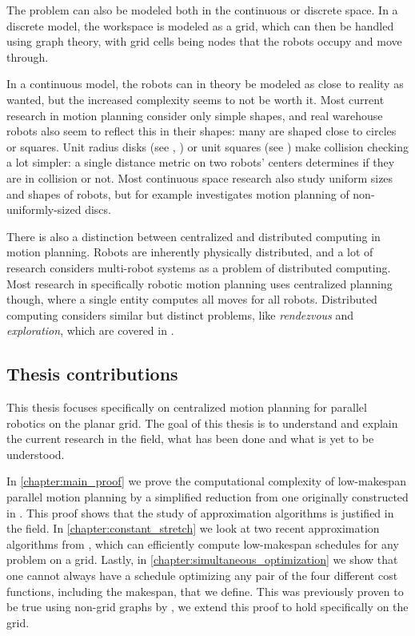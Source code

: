The problem can also be modeled both in the continuous or discrete space.
In a discrete model, the workspace is modeled as a grid, which can then be handled using graph theory, with grid cells being nodes that the robots occupy and move through.

In a continuous model, the robots can in theory be modeled as close to reality as wanted, but the increased complexity seems to not be worth it.
Most current research in motion planning consider only simple shapes, and real warehouse robots also seem to reflect this in their shapes: many are shaped close to circles or squares.
Unit radius disks (see \cite{siamcomp/DemaineFKMS19}, \cite{compgeom/BanyassadyBBBFH22}) or unit squares (see \cite{jea/YangV22}) make collision checking a lot simpler: a single distance metric on two robots' centers determines if they are in collision or not.
Most continuous space research also study uniform sizes and shapes of robots, but for example \cite{fun/BrockenHKLS21} investigates motion planning of non-uniformly-sized discs.

There is also a distinction between centralized and distributed computing in motion planning.
Robots are inherently physically distributed, and a lot of research considers multi-robot systems as a problem of distributed computing.
Most research in specifically robotic motion planning uses centralized planning though, where a single entity computes all moves for all robots.
Distributed computing considers similar but distinct problems, like \emph{rendezvous} and \emph{exploration}, which are covered in \cite{lncs/FlocchiniGN19}.




\subsection{Thesis contributions}

This thesis focuses specifically on centralized motion planning for parallel robotics on the planar grid.
The goal of this thesis is to understand and explain the current research in the field, what has been done and what is yet to be understood.

In \cref{chapter:main_proof} we prove the computational complexity of low-makespan parallel motion planning by a simplified reduction from one originally constructed in \cite{siamcomp/DemaineFKMS19}.
This proof shows that the study of approximation algorithms is justified in the field.
In \cref{chapter:constant_stretch} we look at two recent approximation algorithms from \cite{siamcomp/DemaineFKMS19}, which can efficiently compute low-makespan schedules for any problem on a grid.
Lastly, in \cref{chapter:simultaneous_optimization} we show that one cannot always have a schedule optimizing any pair of the four different cost functions, including the makespan, that we define.
This was previously proven to be true using non-grid graphs by \cite{corr/YuL15c}, we extend this proof to hold specifically on the grid.
